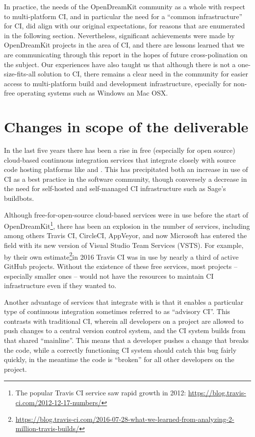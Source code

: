 \documentclass{deliverablereport}
\begin{document}
In practice, the needs of the OpenDreamKit community as a whole with respect to
multi-platform CI, and in particular the need for a ``common infrastructure''
for CI, did align with our original expectations, for reasons that are
enumerated in the following section.  Nevertheless, significant achievements
were made by OpenDreamKit projects in the area of CI, and there are lessons
learned that we are communicating through this report in the hopes of future
cross-polination on the subject.  Our experiences have also taught us that
although there is not a one-size-fits-all solution to CI, there remains a clear
need in the community for easier access to multi-platform build and development
infrastructure, epecially for non-free operating systems such as Windows an Mac
OSX.

\hypertarget{changes-to-deliverable}{%
\section{Changes in scope of the deliverable}\label{changes-to-deliverable}}

In the last five years there has been a rise in free (especially for open
source) cloud-based continuous integration services that integrate closely with
source code hosting platforms like \GitHub and \GitLab.  This has precipitated
both an increase in use of CI as a best practice in the software community,
though conversely a decrease in the need for self-hosted and self-managed CI
infrastructure such as Sage's buildbots.

Although free-for-open-source cloud-based services were in use before the start
of OpenDreamKit\footnote{The popular Travis CI service saw rapid growth in
2012: \url{https://blog.travis-ci.com/2012-12-17-numbers/}}, there has been an
explosion in the number of services, including among others Travis CI,
CircleCI, AppVeyor, and now Microsoft has entered the field with its new
version of Visual Studio Team Services (VSTS).  For example, by their own
estimate\footnote{\url{https://blog.travis-ci.com/2016-07-28-what-we-learned-from-analyzing-2-million-travis-builds/}}in
2016 Travis CI was in use by nearly a third of active GitHub projects.  Without
the existence of these free services, most projects -- especially smaller
ones -- would not have the resources to maintain CI infrastructure even if they
wanted to.

Another advantage of services that integrate with \GitHub is that it enables a
particular type of continuous integration sometimes referred to as ``advisory
CI''.  This contrasts with traditional CI, wherein all developers on a project
are allowed to push changes to a central version control system, and the CI
system builds from that shared ``mainline''.  This means that a developer
pushes a change that breaks the code, while a correctly functioning CI system
should catch this bug fairly quickly, in the meantime the code is ``broken''
for all other developers on the project.
\end{document}
